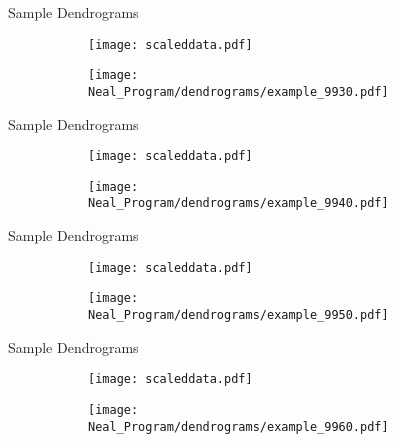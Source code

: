 \documentclass{beamer}
\begin{document}
	\begin{frame}{Sample Dendrograms}
		\begin{figure}[htbp]
			\begin{subfigure}[b]{0.45\columnwidth}
				\centering
				\texttt{[image: scaleddata.pdf]}
			\end{subfigure}
			\hfill
			\begin{subfigure}[b]{0.45\columnwidth}
				\centering
				\texttt{[image: Neal\_Program/dendrograms/example\_9930.pdf]}
			\end{subfigure}
		\end{figure}
	\end{frame}

	\begin{frame}{Sample Dendrograms}
		\begin{figure}[htbp]
			\begin{subfigure}[b]{0.45\columnwidth}
				\centering
				\texttt{[image: scaleddata.pdf]}
			\end{subfigure}
			\hfill
			\begin{subfigure}[b]{0.45\columnwidth}
				\centering
				\texttt{[image: Neal\_Program/dendrograms/example\_9940.pdf]}
			\end{subfigure}
		\end{figure}
	\end{frame}

	\begin{frame}{Sample Dendrograms}
		\begin{figure}[htbp]
			\begin{subfigure}[b]{0.45\columnwidth}
				\centering
				\texttt{[image: scaleddata.pdf]}
			\end{subfigure}
			\hfill
			\begin{subfigure}[b]{0.45\columnwidth}
				\centering
				\texttt{[image: Neal\_Program/dendrograms/example\_9950.pdf]}
			\end{subfigure}
		\end{figure}
	\end{frame}

	\begin{frame}{Sample Dendrograms}
		\begin{figure}[htbp]
			\begin{subfigure}[b]{0.45\columnwidth}
				\centering
				\texttt{[image: scaleddata.pdf]}
			\end{subfigure}
			\hfill
			\begin{subfigure}[b]{0.45\columnwidth}
				\centering
				\texttt{[image: Neal\_Program/dendrograms/example\_9960.pdf]}
			\end{subfigure}
		\end{figure}
	\end{frame}
\end{document}
